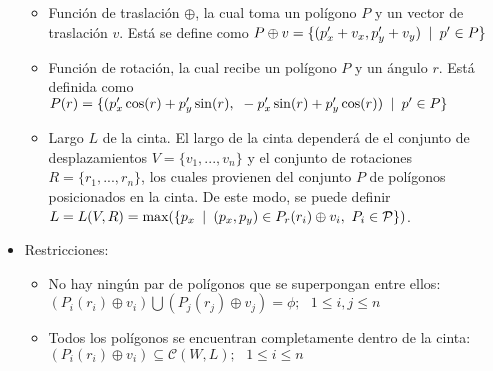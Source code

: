 \begin{itemize}
\begin{itemize}
        \item Función de traslación $\oplus$, la cual toma un polígono $P$ y un vector de traslación $v$. Está se define como $P \oplus v = \{ (p_x' + v_x, p_y' + v_y) \texttt{ } | \texttt{ } p' \in P \}$
        
        \item Función de rotación, la cual recibe un polígono $P$ y un ángulo $r$. Está definida como $P(r) = \{(p_x'\cos(r) + p_y'\sin(r), \text{ } -p_x'\sin(r) + p_y'\cos(r)) \texttt{ } | \texttt{ } p' \in P\}$
        
        \item Largo $L$ de la cinta. El largo de la cinta dependerá de el conjunto de desplazamientos $V = \{v_1, ..., v_n\}$ y el conjunto de rotaciones $R = \{r_1, ..., r_n\}$, los cuales provienen del conjunto $P$ de polígonos posicionados en la cinta. De este modo, se puede definir $L = L(V, R) = \text{max}( \{p_x \texttt{ } | \texttt{ } (p_x, p_y) \in P_r(r_i) \oplus v_i, \text{ } P_i \in \mathcal{P} \})$.
    \end{itemize}

    \item Restricciones:
    \begin{itemize}
        \item No hay ningún par de polígonos que se superpongan entre ellos:\\ $(P_i(r_i) \oplus v_i) \bigcup (P_j(r_j) \oplus v_j) = \phi; \text{ } 1 \leq i, j \leq n$
        
        \item Todos los polígonos se encuentran completamente dentro de la cinta:\\
        $(P_i(r_i) \oplus v_i) \subseteq \mathcal{C}(W, L); \text{ } 1 \leq i \leq n$
    \end{itemize}
\end{itemize}


